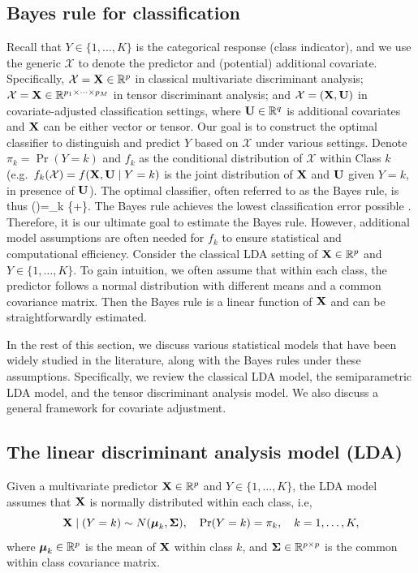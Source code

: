 \subsection{Bayes rule for classification}
Recall that $Y\in\{1,\ldots,K\}$ is the categorical response (class indicator), and we use the generic $\mathcal{X}$ to denote the predictor and (potential) additional covariate. Specifically, $\mathcal{X}=\mathbf{X}\in\mathbb{R}^p$ in classical multivariate discriminant analysis; $\mathcal{X}=\mathbf{X}\in\mathbb{R}^{p_1\times\cdots\times p_M}$ in tensor discriminant analysis; and $\mathcal{X}=(\mathbf{X},\mathbf{U})$ in covariate-adjusted classification settings, where $\mathbf{U}\in\mathbb{R}^q$ is additional covariates and $\mathbf{X}$ can be either vector or tensor. Our goal is to construct the optimal classifier to distinguish and predict $Y$ based on $\mathcal{X}$ under various settings. Denote $\pi_k=\Pr(Y=k)$ and $f_k$ as the conditional distribution of $\mathcal{X}$ within Class $k$ (e.g.~$f_k(\mathcal{X})=f(\mathbf{X},\mathbf{U}\mid Y=k)$ is the joint distribution of $\mathbf{X}$ and $\mathbf{U}$ given $Y=k$, in presence of $\mathbf{U}$). The optimal classifier, often referred to as the Bayes rule, is thus
\beq
\delta(\bX)=\arg\max_k \{+\}.
\eeq
The Bayes rule achieves the lowest classification error possible \citep{FHT01}. Therefore, it is our ultimate goal to estimate the Bayes rule. However, additional model assumptions are often needed for $f_k$ to ensure statistical and computational efficiency. 
Consider the classical LDA setting of $\mathbf{X}\in\mathbb{R}^p$ and $Y\in\{1,\dots,K\}$. To gain intuition, we often assume that within each class, the predictor follows a normal distribution with different means and a common covariance matrix. Then the Bayes rule is a linear function of $\mathbf{X}$ and can be straightforwardly estimated. 


In the rest of this section, we discuss various statistical models that have been widely studied in the literature, along with the Bayes rules under these assumptions. Specifically, we review the classical LDA model, the semiparametric LDA model, and the tensor discriminant analysis model. We also discuss a general  framework for covariate adjustment. 

\subsection{The linear discriminant analysis model (LDA)}\label{Sec: LDA}


Given a multivariate predictor $\mathbf{X}\in\mathbb{R}^p$ and $Y\in\{1,\ldots,K\}$, the LDA model assumes that $\mathbf{X}$ is normally distributed within each class, i.e,
\begin{equation}\label{LDA}
\mathbf{X}\mid(Y=k)\sim N(\boldsymbol{\mu}_k,\boldsymbol{\Sigma}),\quad \mathrm{Pr}(Y=k)=\pi_k,\quad k=1,\ldots,K,
\end{equation}
where $\boldsymbol{\mu}_k\in\mathbb{R}^p$ is the mean of $\mathbf{X}$ within class $k$, and $\boldsymbol{\Sigma}\in\mathbb{R}^{p\times p}$ is the common within class covariance matrix.



